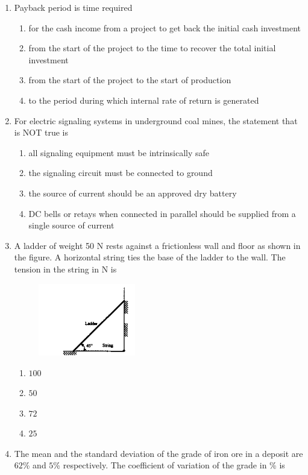 \documentclass[journal,12pt,onecolumn]{IEEEtran}
\theoremstyle{remark}
\begin{document}
\begin{enumerate}
\item Payback period is time required

\hfill{}
\begin{enumerate}
\item for the cash income from a project to get back the initial cash investment  
\item from the start of the project to the time to recover the total initial investment  
\item from the start of the project to the start of production  
\item to the period during which internal rate of return is generated  
\end{enumerate}

\item For electric signaling systems in underground coal mines, the statement that is NOT true is

\hfill{}
\begin{enumerate}
\item all signaling equipment must be intrinsically safe
\item the signaling circuit must be connected to ground
\item the source of current should be an approved dry battery
\item DC bells or retays when connected in parallel should be supplied from a single source of current
\end{enumerate}
\item  A ladder of weight 50 N rests against a frictionless wall and floor as shown in the figure. A horizontal string ties the base of the ladder to the wall. The tension in the string in N is

\hfill{}
\begin{figure}[H]
\centering
\includegraphics[width=0.4\textwidth]{figs/ladder.png} 
\end{figure}
\begin{multicols}{4}
\begin{enumerate}
\item $100$
\item $50$
\item $72$
\item $25$
\end{enumerate}
\end{multicols}
\item The mean and the standard deviation of the grade of iron ore in a deposit are $62$\% and $5$\%
respectively. The coefficient of variation of the grade in \% is


\end{enumerate}
\end{document}
